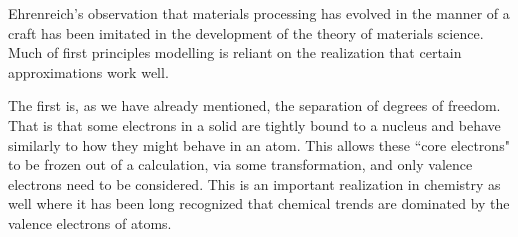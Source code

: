 
Ehrenreich's observation that materials processing has evolved in the manner 
of a craft has been imitated in the development of the 
theory of materials science. Much of first principles modelling is reliant on
the realization that certain approximations work well. 

The first is, as we have already mentioned, 
the separation of degrees of freedom. That is that some electrons in a solid are
tightly bound to a nucleus and behave similarly to how they might behave in an atom.
This allows these ``core electrons" to be frozen out of a calculation, 
via some transformation, and only valence electrons need to be considered. 
This is an important realization in chemistry as well where it has 
been long recognized that chemical trends are dominated by
the valence electrons of atoms. 

